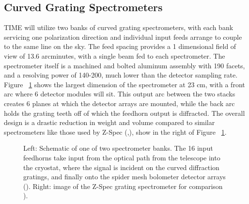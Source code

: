 \documentclass[manuscript]{aastex}
\begin{document}
\subsection{Curved Grating Spectrometers}
TIME will utilize two banks of curved grating spectrometers, with each bank servicing one polarization direction and individual input feeds arrange to couple to the same line on the sky. The feed spacing provides a 1 dimensional field of view of 13.6 arcminutes, with a single beam fed to each spectrometer. The spectrometer itself is a machined and bolted aluminum assembly with 190 facets, and a resolving power of 140-200, much lower than the detector sampling rate. Figure ~\ref{fig:jon2} shows the largest dimension of the spectrometer at 23 cm, with a front arc where 6 detector modules will sit. This output arc between the two stacks creates 6 planes at which the detector arrays are mounted, while the back arc holds the grating teeth off of which the feedhorn output is diffracted. The overall design is a drastic reduction in weight and volume compared to similar spectrometers like those used by Z-Spec (\cite{Zemcov2012},\cite{Crites2014}), show in the right of Figure ~\ref{fig:jon2}.

\begin{figure}[H]%
    \centering
    \qquad
    \singlespace
    \caption[TIME Spectrometer Banks and Detector Modules -(\cite{Hunacek2016})]{Left: Schematic of one of two spectrometer banks. The 16 input feedhorns take input from the optical path from the telescope into the cryostat, where the signal is incident on the curved diffraction gratings, and finally onto the spider mesh bolometer detector arrays (\cite{Hunacek2016}). Right: image of the Z-Spec grating spectrometer for comparison \cite{Crites2014}).}%
    \label{fig:jon2}%
    \vspace{-0.8cm}
\end{figure}
\end{document}
